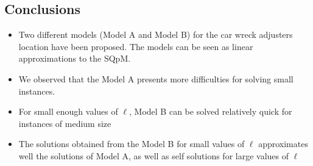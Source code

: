 
  \subsection{Conclusions}
\begin{frame}
  
  \begin{itemize}
  \item Two different models (Model A and Model B) for the car wreck adjusters location have been proposed. 
    The models can be seen as linear approximations to the SQpM.
  \item We observed that the Model A presents more difficulties for solving small instances.
  \item For small enough values of $\ell$, Model B can be solved relatively quick
    for instances of medium size
  \item The solutions obtained from the Model B for small values of $\ell$
    approximates well the solutions of Model A,
    as well as self solutions for large values of $\ell$
  \end{itemize}

\end{frame}
